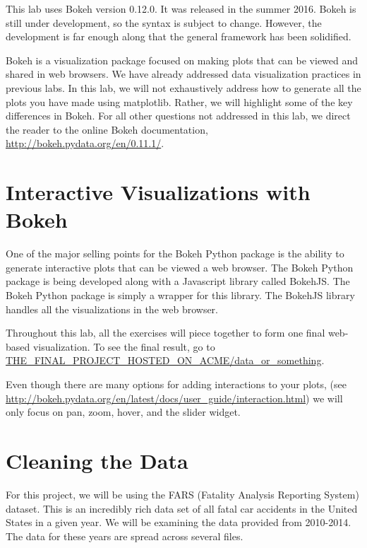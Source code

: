 \label{lab:Bokeh}


\begin{warn}
This lab uses Bokeh version 0.12.0. It was released in the summer 2016. Bokeh
is still under development, so the syntax is subject to change. However, the
development is far enough along that the general framework has been solidified.
\end{warn}

Bokeh is a visualization package focused on making plots that can be viewed and
shared in web browsers. We have already addressed data visualization practices
in previous labs. In this lab, we will not exhaustively address how to generate
all the plots you have made using matplotlib. Rather, we will highlight some of
the key differences in Bokeh. For all other questions not addressed in this lab,
we direct the reader to the online Bokeh documentation,
\url{http://bokeh.pydata.org/en/0.11.1/}.

\section*{Interactive Visualizations with Bokeh}

One of the major selling points for the Bokeh Python package is the ability to
generate interactive plots that can be viewed a web browser.
The Bokeh Python package is being developed along with a Javascript library
called BokehJS. The Bokeh Python package is simply a wrapper for this library.
The BokehJS library handles all the visualizations in the web browser.

Throughout this lab, all the exercises will piece together to form one final
web-based visualization. To see the final result, go to
\url{THE_FINAL_PROJECT_HOSTED_ON_ACME/data_or_something}.

Even though there are many options for adding interactions to your plots,
(see \url{http://bokeh.pydata.org/en/latest/docs/user_guide/interaction.html})
we will only focus on pan, zoom, hover, and the slider widget.

\section*{Cleaning the Data}
For this project, we will be using the FARS (Fatality Analysis Reporting System)
dataset. This is an incredibly rich data set of all fatal car accidents in the
United States in a given year. We will be examining the data provided from
2010-2014. The data for these years are spread across several files.

